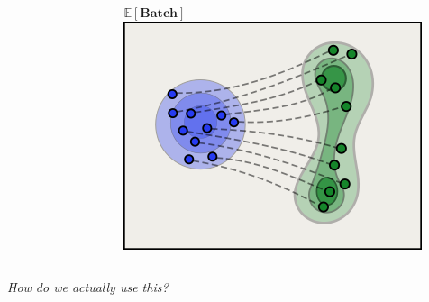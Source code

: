 \documentclass{beamer}
\begin{document}
\begin{frame}
{\begin{columns}
\begin{column}{0.28\linewidth}
\begin{figure}
        \end{figure}
        \end{column}
        \begin{column}{0.28\linewidth}
        \begin{figure}
            \centering
            \( \mathbb{E}[\textbf{Batch}] \)
            \vskip 2pt
            \includegraphics[width=\linewidth]{figures/avg-interpolation.png}
        \end{figure}
        \end{column}
    \end{columns}
    }
\end{frame}
\begin{frame}
    \begin{center}
        \emph{How do we actually use this?}
    \end{center}
\end{frame}
\end{document}
